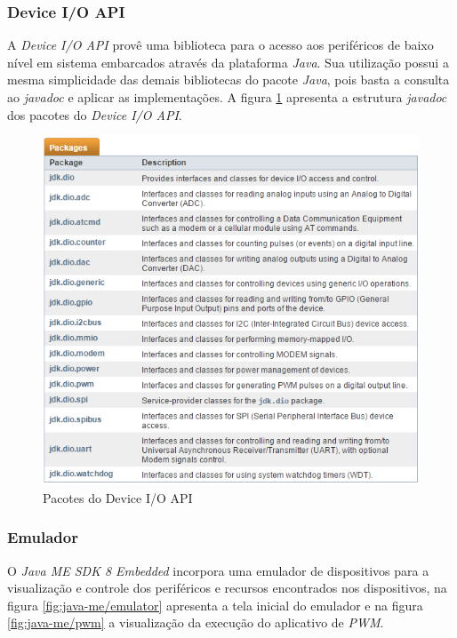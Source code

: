 \subsubsection{Device I/O API}

A \textit{Device I/O API} provê uma biblioteca para o acesso aos periféricos de 
baixo nível em sistema embarcados através da plataforma \textit{Java}. Sua 
utilização possui a mesma simplicidade das demais bibliotecas do pacote 
\textit{Java}, pois basta a consulta ao \textit{javadoc} e aplicar as 
implementações. A figura \ref{fig:java-me/java-me-javadoc-deviceioapi} apresenta a estrutura \textit{javadoc} dos pacotes do \textit{Device I/O API}.

\begin{figure}[H]
	\centering
	\includegraphics[width=0.7\linewidth]{figuras/java/java-me-javadoc-deviceioapi.png}
	\caption{Pacotes do Device I/O API}
	\label{fig:java-me/java-me-javadoc-deviceioapi}
\end{figure}

\subsubsection{Emulador}

O \textit{Java ME SDK 8 Embedded} incorpora uma emulador de dispositivos para a 
visualização e controle dos periféricos e recursos encontrados nos 
dispositivos, na figura \ref{fig:java-me/emulator} apresenta a tela inicial do 
emulador e na figura \ref{fig:java-me/pwm} a visualização da execução do 
aplicativo de \textit{PWM}.

